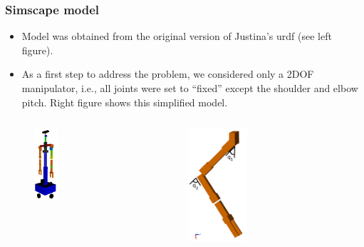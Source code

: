 \documentclass[9pt,spanish,aspectratio=1610]{beamer}
\begin{document}
\begin{frame}\frametitle{Simscape model}
  \begin{itemize}
  \item Model was obtained from the original version of Justina's urdf (see left figure).
  \item As a first step to address the problem, we considered only a 2DOF manipulator, i.e., all joints were set to ``fixed'' except the shoulder and elbow pitch. Right figure shows this simplified model. 
  \end{itemize}
  \begin{columns}
    \begin{column}{0.5\textwidth}
      \begin{figure}
        \centering
        \includegraphics[width=0.3\textwidth]{Figures/justina_urdf.png}
      \end{figure}
    \end{column}
    \begin{column}{0.5\textwidth}
      \begin{figure}
        \centering
        \includegraphics[width=0.4\textwidth]{Figures/simplified_model.png}

\end{figure}
\end{column}
\end{columns}
\end{frame}
\end{document}
